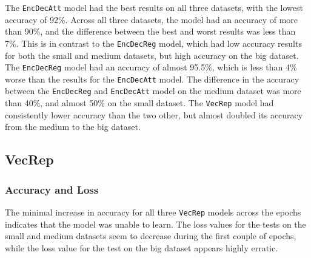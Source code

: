 The {\tt EncDecAtt} model had the best results on all three datasets, with the lowest accuracy of 92\%. Across all three datasets, the model had an accuracy of more than 90\%, and the difference between the best and worst results was less than 7\%. This is in contrast to the {\tt EncDecReg} model, which had low accuracy results for both the small and medium datasets, but high accuracy on the big dataset. The {\tt EncDecReg} model had an accuracy of almost 95.5\%, which is less than 4\% worse than the results for the {\tt EncDecAtt} model. The difference in the accuracy between the {\tt EncDecReg} and {\tt EncDecAtt} model on the medium dataset was more than 40\%, and almost 50\% on the small dataset. The {\tt VecRep} model had consistently lower accuracy than the two other, but almost doubled its accuracy from the medium to the big dataset.

\subsection{VecRep}
\subsubsection{Accuracy and Loss}

The minimal increase in accuracy for all three {\tt VecRep} models across the epochs indicates that the model was unable to learn. The loss values for the tests on the small and medium datasets seem to decrease during the first couple of epochs, while the loss value for the test on the big dataset appears highly erratic.

\newpage
